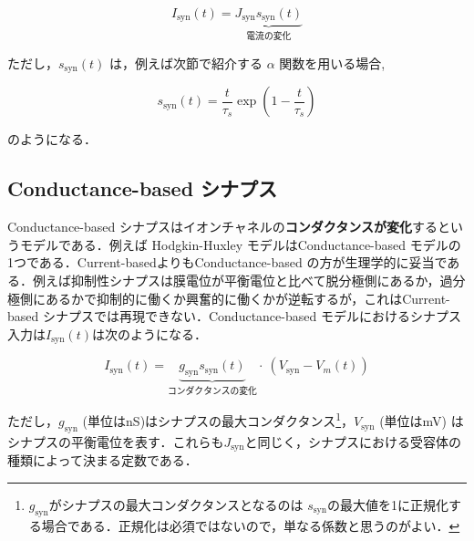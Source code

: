 \begin{equation}

I_{\text{syn}}(t)=\underbrace{J_{\text{syn}}s_{\text{syn}}(t)}_{電流の変化}    

\end{equation}





ただし，$s_{\text{syn}}(t)$ は，例えば次節で紹介する $\alpha$ 関数を用いる場合, 





\begin{equation}

s_{\text{syn}}(t)=\dfrac{t}{\tau_s} \exp \left(1-\dfrac{t}{\tau_s}\right)    

\end{equation}





のようになる．



\subsection{Conductance-based シナプス
}
Conductance-based シナプスはイオンチャネルの\textbf{コンダクタンスが変化}するというモデルである．例えば Hodgkin-Huxley モデルはConductance-based モデルの1つである．Current-basedよりもConductance-based の方が生理学的に妥当である．例えば抑制性シナプスは膜電位が平衡電位と比べて脱分極側にあるか，過分極側にあるかで抑制的に働くか興奮的に働くかが逆転するが，これはCurrent-based シナプスでは再現できない．Conductance-based モデルにおけるシナプス入力は$I_{\text{syn}}(t)$は次のようになる． 





\begin{equation}

I_{\text{syn}}(t)=\underbrace{g_{\text{syn}}s_{\text{syn}}(t)}_{コンダクタンスの変化}\cdot\ \left(V_{\text{syn}}-V_{m}(t)\right)    

\end{equation}





ただし，$g_{\text{syn}}$ (単位はnS)はシナプスの最大コンダクタンス\footnote{$g_{\text{syn}}$がシナプスの最大コンダクタンスとなるのは $s_{\text{syn}}$の最大値を1に正規化する場合である．正規化は必須ではないので，単なる係数と思うのがよい．}，$V_{\text{syn}}$ (単位はmV) はシナプスの平衡電位を表す．これらも$J_{\text{syn}}$と同じく，シナプスにおける受容体の種類によって決まる定数である．



